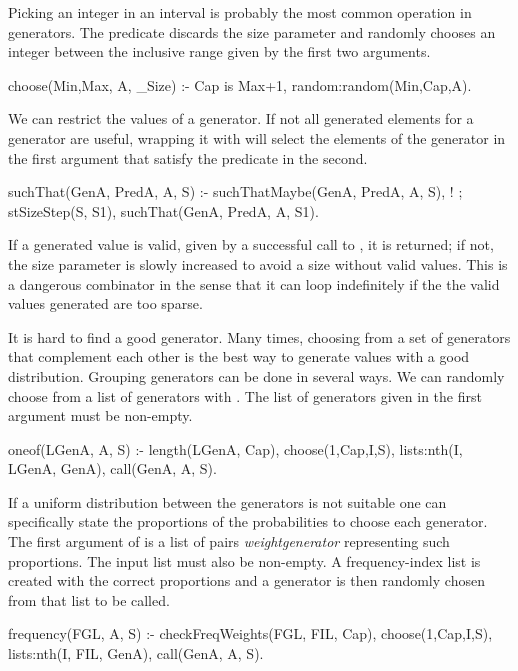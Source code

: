 Picking an integer in an interval is probably the most common operation
in generators.
%
The  predicate discards the size parameter and randomly
chooses an integer between the inclusive range given by the first two
arguments.
%
\begin{yapcode}
 choose(Min,Max, A, _Size) :- Cap is Max+1, random:random(Min,Cap,A).
\end{yapcode}


We can restrict the values of a generator. %
%
If not all generated elements for a generator are useful, wrapping it
with  will select the elements of the generator in the
first argument that satisfy the predicate in the second.
%
\begin{yapcode}
 suchThat(GenA, PredA, A, S) :- suchThatMaybe(GenA, PredA, A, S), !
   ; stSizeStep(S, S1), suchThat(GenA, PredA, A, S1).
\end{yapcode}
%
If a generated value is valid, given by a successful call to
, it is returned; if not, the size parameter is
slowly increased to avoid a size without valid values.
%
This is a dangerous combinator in the sense that it can loop
indefinitely  if the the valid values generated are too sparse.


It is hard to find a good generator.
%
Many times, choosing from a set of generators that complement each other
is the best way to generate values with a good distribution.
%
Grouping generators can be done in several ways.
%
We can randomly choose from a list of generators with .
%
The list of generators given in the first argument must be non-empty.
%
\begin{yapcode}
 oneof(LGenA, A, S) :- length(LGenA, Cap), choose(1,Cap,I,S),
   lists:nth(I, LGenA, GenA), call(GenA, A, S).
\end{yapcode}
%
If a uniform distribution between the generators is not suitable one can
specifically state the proportions of the probabilities to choose each
generator.
%
The first argument of  is a list of pairs
\yap{\{}\emph{weight}\yap{,}\emph{generator}\yap{\}} representing such
proportions.
%
The input list must also be non-empty.
%
A frequency-index list is created with the correct proportions and a
generator is then randomly chosen from that list to be called.
\begin{yapcode}
 frequency(FGL, A, S) :- checkFreqWeights(FGL, FIL, Cap),
   choose(1,Cap,I,S), lists:nth(I, FIL, GenA), call(GenA, A, S).
\end{yapcode}

